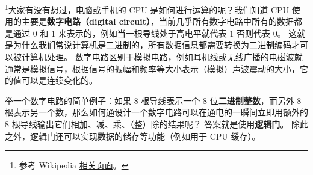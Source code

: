 
\begin{issues}
\issueDraft
\end{issues}

\footnote{参考 Wikipedia \href{https://en.wikipedia.org/wiki/Boolean_algebra}{相关页面}。}大家有没有想过，电脑或手机的 CPU 是如何进行运算的呢？我们知道 CPU 使用的主要是\textbf{数字电路（digital circuit）}，当前几乎所有数字电路中所有的数据都是通过 $0$ 和 $1$ 来表示的，例如当一根导线处于高电平就代表 $1$ 否则代表 $0$。 这就是为什么我们常说计算机是二进制的，所有数据信息都需要转换为二进制编码才可以被计算机处理。 数字电路区别于模拟电路，例如耳机线或无线广播的电磁波就通常是模拟信号，根据信号的振幅和频率等大小表示（模拟）声波震动的大小，它的值可以是连续变化的。

举一个数字电路的简单例子：如果 8 根导线表示一个 8 位\textbf{二进制整数}，而另外 8 根表示另一个数，那么如何通设计一个数字电路可以在通电的一瞬间立即用额外的 8 根导线输出它们相加、减、乘、（整）除的结果呢？ 答案就是使用\textbf{逻辑门}。 除此之外，逻辑门还可以实现数据的储存等功能（例如用于 CPU 缓存）。

